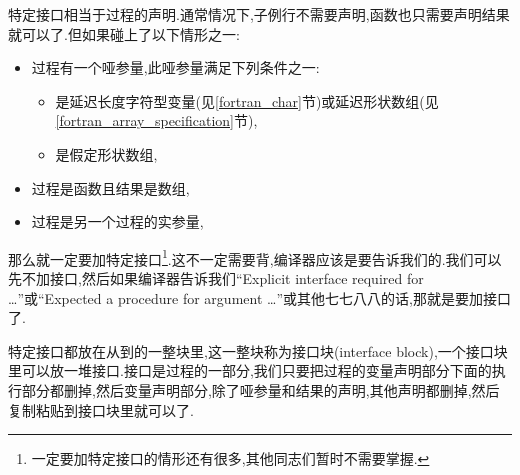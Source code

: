 特定接口相当于过程的声明.通常情况下,子例行不需要声明,函数也只需要声明结果就可以了.但如果碰上了以下情形之一:
\begin{itemize}
    \item 过程有一个哑参量,此哑参量满足下列条件之一:\begin{itemize}
        \item 是延迟长度字符型变量(见\ref{fortran_char}节)或延迟形状数组(见\ref{fortran_array_specification}节),
        \item 是假定形状数组,
    \end{itemize}
    \item 过程是函数且结果是数组,
    \item 过程是另一个过程的实参量,
\end{itemize}
那么就一定要加特定接口\footnote{一定要加特定接口的情形还有很多,其他同志们暂时不需要掌握.}.这不一定需要背,编译器应该是要告诉我们的.我们可以先不加接口,然后如果编译器告诉我们``Explicit interface required for \dots''或``Expected a procedure for argument \dots''或其他七七八八的话,那就是要加接口了.

特定接口都放在从到的一整块里,这一整块称为接口块(interface block),一个接口块里可以放一堆接口.接口是过程的一部分,我们只要把过程的变量声明部分下面的执行部分都删掉,然后变量声明部分,除了哑参量和结果的声明,其他声明都删掉,然后复制粘贴到接口块里就可以了.


